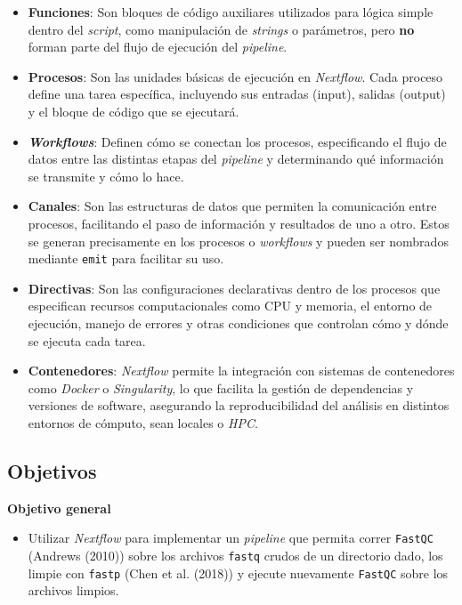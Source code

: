 \documentclass[
  letterpaper,
  DIV=11,
  numbers=noendperiod]{scrartcl}
\providecommand{\tightlist}{%
  \setlength{\itemsep}{0pt}\setlength{\parskip}{0pt}}
\begin{document}
\begin{itemize}
\item
  \textbf{Funciones}: Son bloques de código auxiliares utilizados para
  lógica simple dentro del \emph{script}, como manipulación de
  \emph{strings} o parámetros, pero \textbf{no} forman parte del flujo
  de ejecución del \emph{pipeline}.
\item
  \textbf{Procesos}: Son las unidades básicas de ejecución en
  \emph{Nextflow}. Cada proceso define una tarea específica, incluyendo
  sus entradas (input), salidas (output) y el bloque de código que se
  ejecutará.
\item
  \textbf{\emph{Workflows}}: Definen cómo se conectan los procesos,
  especificando el flujo de datos entre las distintas etapas del
  \emph{pipeline} y determinando qué información se transmite y cómo lo
  hace.
\item
  \textbf{Canales}: Son las estructuras de datos que permiten la
  comunicación entre procesos, facilitando el paso de información y
  resultados de uno a otro. Estos se generan precisamente en los
  procesos o \emph{workflows} y pueden ser nombrados mediante
  \texttt{emit} para facilitar su uso.
\item
  \textbf{Directivas}: Son las configuraciones declarativas dentro de
  los procesos que especifican recursos computacionales como CPU y
  memoria, el entorno de ejecución, manejo de errores y otras
  condiciones que controlan cómo y dónde se ejecuta cada tarea.
\item
  \textbf{Contenedores}: \emph{Nextflow} permite la integración con
  sistemas de contenedores como \emph{Docker} o \emph{Singularity}, lo
  que facilita la gestión de dependencias y versiones de software,
  asegurando la reproducibilidad del análisis en distintos entornos de
  cómputo, sean locales o \emph{HPC}.
\end{itemize}

\subsection{Objetivos}\label{objetivos}

\textbf{Objetivo general}

\begin{itemize}
\tightlist
\item
  Utilizar \emph{Nextflow} para implementar un \emph{pipeline} que
  permita correr \texttt{FastQC} (Andrews (2010)) sobre los archivos
  \texttt{fastq} crudos de un directorio dado, los limpie con
  \texttt{fastp} (Chen et al. (2018)) y ejecute nuevamente
  \texttt{FastQC} sobre los archivos limpios.
\end{itemize}
\end{document}
